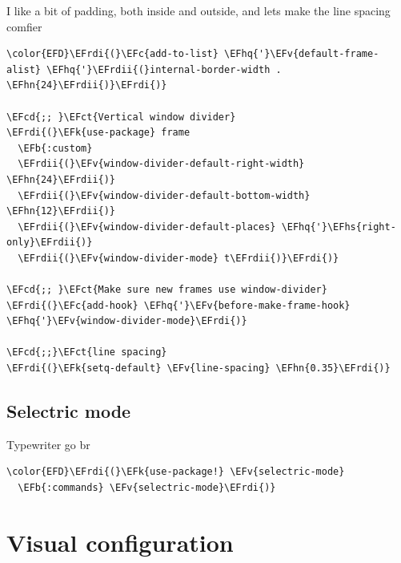 \documentclass{scrartcl}
\newcommand{\EFk}[1]{\textcolor{EFk}{#1}} %
\newcommand{\EFb}[1]{\textcolor{EFb}{#1}} %
\newcommand{\EFct}[1]{\textcolor{EFct}{#1}} %
\newcommand{\EFc}[1]{\textcolor{EFc}{#1}} %
\newcommand{\EFv}[1]{\textcolor{EFv}{#1}} %
\newcommand{\EFcd}[1]{\textcolor{EFcd}{#1}} %
\newcommand{\EFhn}[1]{\textcolor{EFhn}{\textbf{#1}}} %
\newcommand{\EFhq}[1]{\textcolor{EFhq}{#1}} %
\newcommand{\EFhs}[1]{\textcolor{EFhs}{#1}} %
\newcommand{\EFrdi}[1]{\textcolor{EFrdi}{#1}} %
\newcommand{\EFrdii}[1]{\textcolor{EFrdii}{#1}} %
\begin{document}
I like a bit of padding, both inside and outside, and lets make the line spacing comfier
\begin{Code}
\begin{Verbatim}[]
\color{EFD}\EFrdi{(}\EFc{add-to-list} \EFhq{'}\EFv{default-frame-alist} \EFhq{'}\EFrdii{(}internal-border-width . \EFhn{24}\EFrdii{)}\EFrdi{)}

\EFcd{;; }\EFct{Vertical window divider}
\EFrdi{(}\EFk{use-package} frame
  \EFb{:custom}
  \EFrdii{(}\EFv{window-divider-default-right-width} \EFhn{24}\EFrdii{)}
  \EFrdii{(}\EFv{window-divider-default-bottom-width} \EFhn{12}\EFrdii{)}
  \EFrdii{(}\EFv{window-divider-default-places} \EFhq{'}\EFhs{right-only}\EFrdii{)}
  \EFrdii{(}\EFv{window-divider-mode} t\EFrdii{)}\EFrdi{)}

\EFcd{;; }\EFct{Make sure new frames use window-divider}
\EFrdi{(}\EFc{add-hook} \EFhq{'}\EFv{before-make-frame-hook} \EFhq{'}\EFv{window-divider-mode}\EFrdi{)}

\EFcd{;;}\EFct{line spacing}
\EFrdi{(}\EFk{setq-default} \EFv{line-spacing} \EFhn{0.35}\EFrdi{)}
\end{Verbatim}
\end{Code}

\subsection{Selectric mode}
\label{sec:orgaab0363}
Typewriter go br
\begin{Code}
\begin{Verbatim}[]
\color{EFD}\EFrdi{(}\EFk{use-package!} \EFv{selectric-mode}
  \EFb{:commands} \EFv{selectric-mode}\EFrdi{)}
\end{Verbatim}
\end{Code}

\section{Visual configuration}
\label{sec:org7074bb4}
\end{document}
